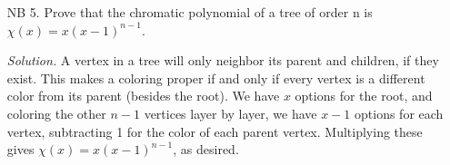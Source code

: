 \documentclass[11pt,letterpaper]{article}
\newenvironment{solution}{\color{Violet}\textit{Solution.}}{\color{black}}
\begin{document}
\begin{enumerate}
\begin{solution}
        Suppose that for some $k$, the entry $(i,j)$ of $A^k$ equal the number of walks of length $k$ from $i$ to $j$. Now consider some $(s,t)$ entry of $A^{k+1}=A^k \cdot A$. By the matrix multiplication formula, we have
        \[
            (A^{k+1})_{s,t} = \sum_{i=1}^n (A^k)_{s,i} \cdot A_{i,t}.
        \]
        By our inductive hypothesis, $(A^k)_{s,i}$ is the number of walks of length $k$ from $s$ to $i$. Additionally, $A_{i,t}$ is the number of edges connecting $i$ and $t$. Thus, $(A^k)_{s,i} \cdot A_{i,t}$ is the number of walks of length $k+1$ from $s$ to $t$ that passes through $i$. When summed for each disjoint $i$, we have the total number of walks of length $k+1$ from $s$ to $t$. Since this is equal to $(A^{k+1})_{s,t}$, our inductive step is complete.
    \end{solution}

    \item[NB 5.] Prove that the chromatic polynomial of a tree of order n is $\chi(x) = x (x-1)^{n-1}$.
    
    \begin{solution}
        A vertex in a tree will only neighbor its parent and children, if they exist. This makes a coloring proper if and only if every vertex is a different color from its parent (besides the root). We have $x$ options for the root, and coloring the other $n-1$ vertices layer by layer, we have $x-1$ options for each vertex, subtracting 1 for the color of each parent vertex. Multiplying these gives $\chi(x) = x (x-1)^{n-1}$, as desired.
    \end{solution}

\end{enumerate}
\end{document}
